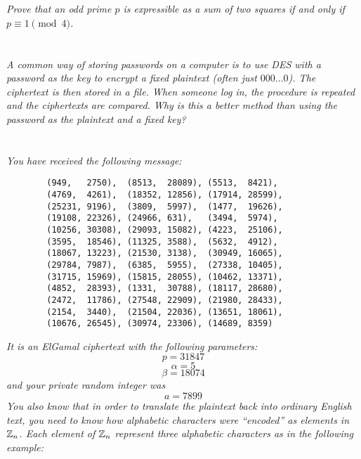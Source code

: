 \documentclass[12pt]{article}
\begin{document}
\newpage

\section{} \textit{Prove that an odd prime $p$ is expressible as a sum of two squares if and only if $p \equiv 1 \pmod{4}$.}

\newpage

\section{} \textit{A common way of storing passwords on a computer is to use DES with a password as the key to encrypt a fixed plaintext (often just $000\dots0$). The ciphertext is then stored in a file. When someone log in, the procedure is repeated and the ciphertexts are compared. Why is this a better method than using the password as the plaintext and a fixed key?}

\newpage

\section{} \textit{You have received the following message:}

    \begin{verbatim}
        (949,   2750),  (8513,  28089), (5513,  8421),
        (4769,  4261),  (18352, 12856), (17914, 28599),
        (25231, 9196),  (3809,  5997),  (1477,  19626),
        (19108, 22326), (24966, 631),   (3494,  5974),
        (10256, 30308), (29093, 15082), (4223,  25106),
        (3595,  18546), (11325, 3588),  (5632,  4912),
        (18067, 13223), (21530, 3138),  (30949, 16065),
        (29784, 7987),  (6385,  5955),  (27338, 10405),
        (31715, 15969), (15815, 28055), (10462, 13371),
        (4852,  28393), (1331,  30788), (18117, 28680),
        (2472,  11786), (27548, 22909), (21980, 28433),
        (2154,  3440),  (21504, 22036), (13651, 18061),
        (10676, 26545), (30974, 23306), (14689, 8359)
    \end{verbatim}

\textit{It is an ElGamal ciphertext with the following parameters:}
    $$p = 31847$$
    $$\alpha = 5$$
    $$\beta = 18074$$
\textit{and your private random integer was}
    $$a = 7899$$
\textit{You also know that in order to translate the plaintext back into ordinary English text, you need to know how alphabetic characters were ``encoded'' as elements in $\mathbb{Z}_n$.  Each element of $\mathbb{Z}_n$ represent three alphabetic characters as in the following example:}
\end{document}
